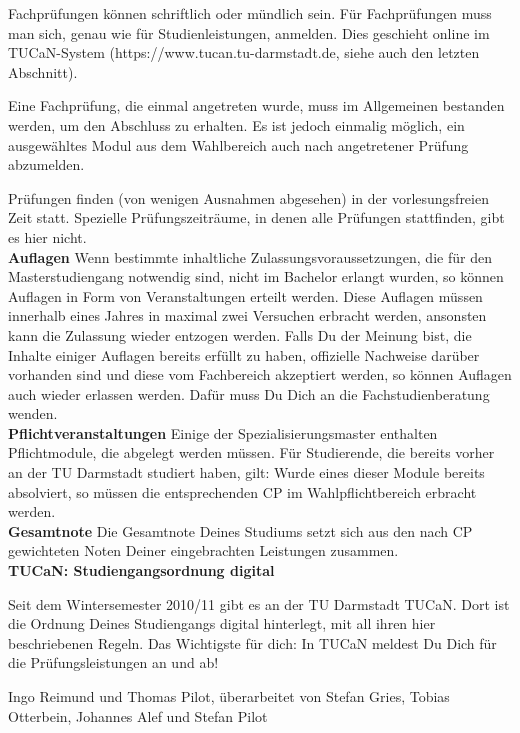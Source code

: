 {    

    Fachprüfungen können schriftlich oder mündlich sein. Für Fachprüfungen muss man sich, genau wie für Studienleistungen, anmelden. Dies geschieht online im TUCaN-System (https://www.tucan.tu-darmstadt.de, siehe auch den letzten Abschnitt).

    Eine Fachprüfung, die einmal angetreten wurde, muss im Allgemeinen bestanden werden, um den Abschluss zu erhalten. Es ist jedoch einmalig möglich, ein ausgewähltes Modul aus dem Wahlbereich auch nach angetretener Prüfung abzumelden.

    Prüfungen finden (von wenigen Ausnahmen abgesehen) in der vorlesungsfreien Zeit statt. Spezielle Prüfungszeiträume, in denen alle Prüfungen stattfinden, gibt es hier nicht.\\


    \noindent\textbf{Auflagen}
    Wenn bestimmte inhaltliche Zulassungsvoraussetzungen, die für den Masterstudiengang notwendig sind, nicht im Bachelor erlangt wurden, so können Auflagen in Form von Veranstaltungen erteilt werden. Diese Auflagen müssen innerhalb eines Jahres in maximal zwei Versuchen erbracht werden, ansonsten kann die Zulassung wieder entzogen werden. Falls Du der Meinung bist, die Inhalte einiger Auflagen bereits erfüllt zu haben, offizielle Nachweise darüber vorhanden sind und diese vom Fachbereich akzeptiert werden, so können Auflagen auch wieder erlassen werden. Dafür muss Du Dich an die Fachstudienberatung wenden.\\


    \noindent\textbf{Pflichtveranstaltungen}
    Einige der Spezialisierungsmaster enthalten Pflichtmodule, die abgelegt werden müssen. Für Studierende, die bereits vorher an der TU Darmstadt studiert haben, gilt: Wurde eines dieser Module bereits absolviert, so müssen die entsprechenden CP im Wahlpflichtbereich erbracht werden.\\

    \noindent\textbf{Gesamtnote}
    Die Gesamtnote Deines Studiums setzt sich aus den nach CP gewichteten Noten Deiner eingebrachten Leistungen zusammen.\\


    \noindent\textbf{TUCaN: Studiengangsordnung digital}

    Seit dem Wintersemester 2010/11 gibt es an der TU Darmstadt TUCaN. Dort ist die Ordnung Deines Studiengangs digital hinterlegt, mit all ihren hier beschriebenen Regeln. Das Wichtigste für dich: In TUCaN meldest Du Dich für die Prüfungsleistungen an und ab!
}
{Ingo Reimund und Thomas Pilot, überarbeitet von Stefan Gries, Tobias Otterbein, Johannes Alef und Stefan Pilot}

